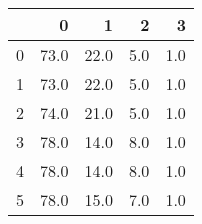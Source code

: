 \begin{tabular}{lrrrr}
\toprule
{} &     0 &     1 &    2 &    3 \\
\midrule
0 &  73.0 &  22.0 &  5.0 &  1.0 \\
1 &  73.0 &  22.0 &  5.0 &  1.0 \\
2 &  74.0 &  21.0 &  5.0 &  1.0 \\
3 &  78.0 &  14.0 &  8.0 &  1.0 \\
4 &  78.0 &  14.0 &  8.0 &  1.0 \\
5 &  78.0 &  15.0 &  7.0 &  1.0 \\
\bottomrule
\end{tabular}
